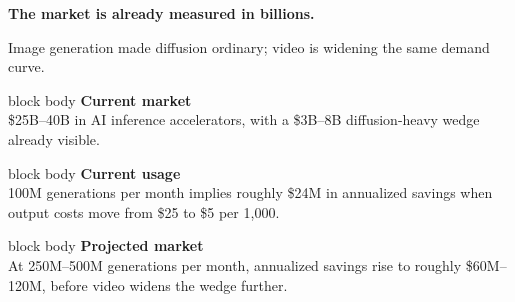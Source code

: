 \documentclass[aspectratio=169,11pt]{beamer}
\newcommand{\money}[1]{\$#1}
\begin{document}
\begin{frame}[plain]
\vspace{0.25em}
\begin{center}
  {\fontsize{24}{28}\selectfont\bfseries The market is already measured in billions.}\par

  \vspace{0.15em}
  {\normalsize Image generation made diffusion ordinary; video is widening the same demand curve.}\par

  \vspace{0.30em}

  \begin{minipage}{0.78\textwidth}
      \begin{beamercolorbox}[wd=\linewidth,sep=0.45em,rounded=true]{block body}
      {\bfseries Current market}\\[0.15em]
      {\small \money{25B--40B} in AI inference accelerators, with a \money{3B--8B} diffusion-heavy wedge already visible.}
      \end{beamercolorbox}

      \vspace{0.18em}

      \begin{beamercolorbox}[wd=\linewidth,sep=0.45em,rounded=true]{block body}
      {\bfseries Current usage}\\[0.15em]
      {\small 100M generations per month implies roughly \money{24M} in annualized savings when output costs move from \money{25} to \money{5} per 1{,}000.}
      \end{beamercolorbox}

      \vspace{0.18em}

      \begin{beamercolorbox}[wd=\linewidth,sep=0.45em,rounded=true]{block body}
      {\bfseries Projected market}\\[0.15em]
      {\small At 250M--500M generations per month, annualized savings rise to roughly \money{60M--120M}, before video widens the wedge further.}
      \end{beamercolorbox}
  \end{minipage}
\end{center}
\end{frame}
\end{document}
